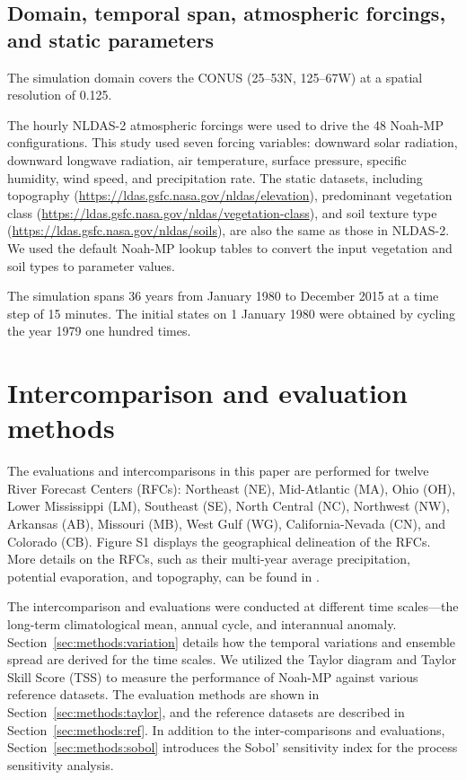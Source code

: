 \documentclass[essd, manuscript]{copernicus}
\begin{document}
\subsection{Domain, temporal span, atmospheric forcings, and static parameters}\label{sec:data:static}

The simulation domain covers the CONUS (25\degree{}--53\degree{}N, 125\degree{}--67\degree{}W) at a spatial resolution of 0.125\degree{}.

The hourly NLDAS-2 atmospheric forcings were used to drive the 48 Noah-MP configurations. This study used seven forcing variables: downward solar radiation, downward longwave radiation, air temperature, surface pressure, specific humidity, wind speed, and precipitation rate. The static datasets, including topography (\url{https://ldas.gsfc.nasa.gov/nldas/elevation}), predominant vegetation class (\url{https://ldas.gsfc.nasa.gov/nldas/vegetation-class}), and soil texture type (\url{https://ldas.gsfc.nasa.gov/nldas/soils}), are also the same as those in NLDAS-2. We used the default Noah-MP lookup tables to convert the input vegetation and soil types to parameter values.

The simulation spans 36 years from January 1980 to December 2015 at a time step of 15 minutes. The initial states on 1 January 1980 were obtained by cycling the year 1979 one hundred times.

\section{Intercomparison and evaluation methods}\label{sec:methods}

The evaluations and intercomparisons in this paper are performed for twelve River Forecast Centers (RFCs): Northeast (NE), Mid-Atlantic (MA), Ohio (OH), Lower Mississippi (LM), Southeast (SE), North Central (NC), Northwest (NW), Arkansas (AB), Missouri (MB), West Gulf (WG), California-Nevada (CN), and Colorado (CB). Figure S1 displays the geographical delineation of the RFCs. More details on the RFCs, such as their multi-year average precipitation, potential evaporation, and topography, can be found in \citet[Figure 1]{fei2021WRR}.

The intercomparison and evaluations were conducted at different time scales---the long-term climatological mean, annual cycle, and interannual anomaly. Section~\ref{sec:methods:variation} details how the temporal variations and ensemble spread are derived for the time scales. We utilized the Taylor diagram and Taylor Skill Score (TSS) to measure the performance of Noah-MP against various reference datasets. The evaluation methods are shown in Section~\ref{sec:methods:taylor}, and the reference datasets are described in Section~\ref{sec:methods:ref}. In addition to the inter-comparisons and evaluations, Section~\ref{sec:methods:sobol} introduces the Sobol' sensitivity index for the process sensitivity analysis.
\end{document}
